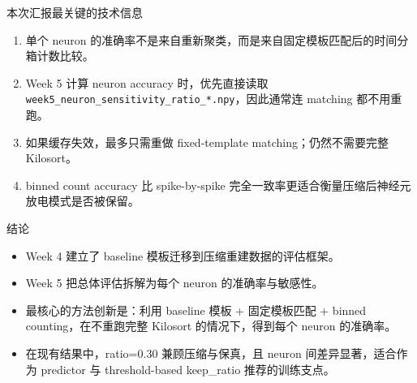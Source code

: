 \documentclass[aspectratio=169,11pt]{beamer}
\begin{document}
\begin{frame}{本次汇报最关键的技术信息}
  \begin{enumerate}
    \item 单个 neuron 的准确率不是来自重新聚类，而是来自\alert{固定模板匹配后的时间分箱计数比较}。
    \item Week 5 计算 neuron accuracy 时，优先直接读取 \texttt{week5\_neuron\_sensitivity\_ratio\_*.npy}，因此通常\alert{连 matching 都不用重跑}。
    \item 如果缓存失效，最多只需重做 fixed-template matching；仍然不需要完整 Kilosort。
    \item binned count accuracy 比 spike-by-spike 完全一致率更适合衡量压缩后神经元放电模式是否被保留。
  \end{enumerate}
\end{frame}

\begin{frame}{结论}
  \begin{itemize}
    \item Week 4 建立了 baseline 模板迁移到压缩重建数据的评估框架。
    \item Week 5 把总体评估拆解为每个 neuron 的准确率与敏感性。
    \item 最核心的方法创新是：\alert{利用 baseline 模板 + 固定模板匹配 + binned counting，在不重跑完整 Kilosort 的情况下，得到每个 neuron 的准确率。}
    \item 在现有结果中，ratio=0.30 兼顾压缩与保真，且 neuron 间差异显著，适合作为 predictor 与 threshold-based keep\_ratio 推荐的训练支点。
  \end{itemize}
\end{frame}
\end{document}
